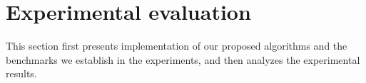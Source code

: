 \documentclass[review]{elsarticle}
\newtheorem{theorem}{Theorem}
\begin{document}
	

	
	


	

	
\section{Experimental evaluation}
This section first presents implementation of our proposed algorithms and the benchmarks we establish in the experiments, and then analyzes the experimental results. 

\end{document}
